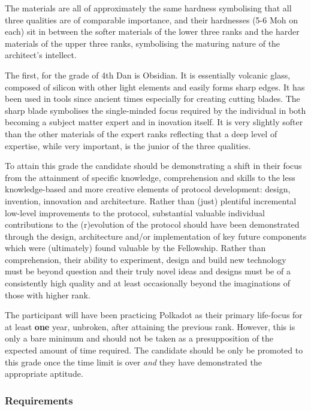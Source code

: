 \documentclass[9pt,oneside]{amsart}
\begin{document}
The materials are all of approximately the same hardness symbolising that all three qualities are of comparable importance, and their hardnesses (5-6 Moh on each) sit in between the softer materials of the lower three ranks and the harder materials of the upper three ranks, symbolising the maturing nature of the architect's intellect.

The first, for the grade of 4th Dan is Obsidian. It is essentially volcanic glass, composed of silicon with other light elements and easily forms sharp edges. It has been used in tools since ancient times especially for creating cutting blades. The sharp blade symbolises the single-minded focus required by the individual in both becoming a subject matter expert and in inovation itself. It is very slightly softer than the other materials of the expert ranks reflecting that a deep level of expertise, while very important, is the junior of the three qualities.

To attain this grade the candidate should be demonstrating a shift in their focus from the attainment of specific knowledge, comprehension and skills to the less knowledge-based and more creative elements of protocol development: design, invention, innovation and architecture. Rather than (just) plentiful incremental low-level improvements to the protocol, substantial valuable individual contributions to the (r)evolution of the protocol should have been demonstrated through the design, architecture and/or implementation of key future components which were (ultimately) found valuable by the Fellowship. Rather than comprehension, their ability to experiment, design and build new technology must be beyond question and their truly novel ideas and designs must be of a consistently high quality and at least occasionally beyond the imaginations of those with higher rank.

The participant will have been practicing Polkadot as their primary life-focus for at least \textbf{one} year, unbroken, after attaining the previous rank. However, this is only a bare minimum and should not be taken as a presupposition of the expected amount of time required. The candidate should be only be promoted to this grade once the time limit is over \emph{and} they have demonstrated the appropriate aptitude.

\subsubsection{Requirements}\label{requirements-3}
\end{document}
